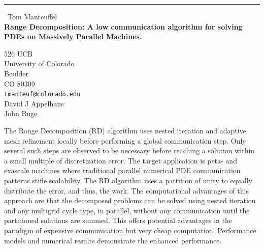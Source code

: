 \documentclass{report}
\begin{document}
\begin{center}
\rule{6in}{1pt} \
{\large Tom Manteuffel \\
{\bf Range Decomposition: A low communication algorithm for solving PDEs on Massively Parallel Machines.}}

526 UCB \\ University of Colorado \\ Boulder \\ CO 80309
\\
{\tt tmanteuf@colorado.edu}\\
David J Appelhans\\
John Ruge\end{center}

The Range Decomposition (RD) algorithm uses nested iteration and adaptive
mesh refinement locally before performing a global communication step.
Only several such steps are observed to be necessary before reaching a
solution within a small multiple of discretization error. The target
application is peta- and exascale machines where traditional parallel
numerical PDE communication patterns stifle scalability. The RD algorithm
uses a partition of unity to equally distribute the error, and thus, the
work. The computational advantages of this approach are that the
decomposed problems can be solved using nested iteration and any
multigrid cycle type, in parallel, without any communication until the
partitioned solutions are summed. This offers potential advantages in the
paradigm of expensive communication but very cheap computation.
Performance models and numerical results demonstrate the enhanced
performance.
\end{document}
